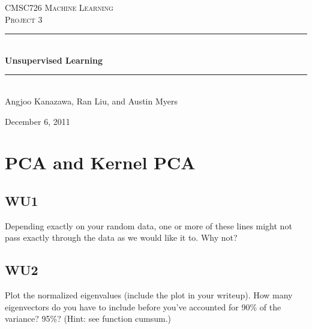 \documentclass[a4paper,11pt]{article}
\newcommand{\HRule}{\rule{\linewidth}{0.5mm}}
\begin{document}
\begin{titlepage}
\begin{center}

\textsc{\LARGE CMSC726 Machine Learning}\\[1.5cm]

\textsc{\Large Project 3}\\[0.5cm]

\HRule \\[0.5cm]

{ \huge \bfseries Unsupervised Learning}\\[0.4cm]

\HRule \\[1.5cm]

{\large Angjoo Kanazawa, Ran Liu, and Austin Myers}

\vfill

{\large December 6, 2011}

\end{center}
\end{titlepage}

\section{PCA and Kernel PCA}
\subsection{WU1}
\textsf{Depending exactly on your random data, one or more of these lines might
not pass exactly through the data as we would like it to. Why not?}\vspace{0.1in}

\subsection{WU2}
\textsf{Plot the normalized eigenvalues (include the plot in your writeup). 
How many eigenvectors do you have to include before you've accounted 
for 90\% of the variance? 95\%? (Hint: see function cumsum.)}\vspace{0.1in}

\end{document}
